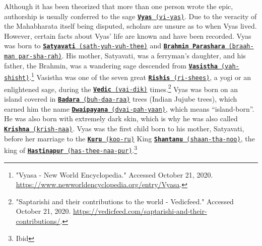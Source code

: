 \documentclass[10pt, letterpaper]{article}
\begin{document}
Although it has been theorized that more than one person wrote the epic,
authorship is usually conferred to the sage
\texttt{\underline{\textbf{\href{https://drive.google.com/file/d/12cpmbRkjohkLqUEyaP0_y7Y2CXE5YVam/view?usp=sharing}{Vyas}}
(vi-yas)}}. Due to the veracity of the Mahabharata itself being disputed,
scholars are unsure as to when Vyas lived. However, certain facts about
Vyas' life are known and have been recorded. Vyas was born to
\texttt{\underline{\href{https://drive.google.com/file/d/1N6ZbkjVOR-5Tl6Nwk2oZ76M9zSoGGIcI/view?usp=sharing}{\textbf{Satyavati}}
(sath-yuh-vuh-thee)}} and
\texttt{\underline{\href{https://drive.google.com/file/d/1M3Rknc2l6nV_ri-ZFsxkXIlV-g-udIMh/view?usp=sharing}{\textbf{Brahmin
Parashara}} (braah-man par-sha-rah)}}. His mother, Satyavati, was a
ferryman's daughter, and his father, the Brahmin, was a wandering sage
descended from
\texttt{\underline{\href{https://drive.google.com/file/d/1UBiNRUMQkQvRFdLQz8eNvUXrkh54ZBk0/view?usp=sharing}{\textbf{Vasistha}}
(vah-shisht)}}.\footnote{"Vyasa - New World Encyclopedia." Accessed
  October 21, 2020.
  \href{https://www.newworldencyclopedia.org/entry/Vyasa}{\underline{https://www.newworldencyclopedia.org/entry/Vyasa}}.}
Vasistha was one of the seven great
\texttt{\underline{\href{https://drive.google.com/file/d/1fETQfhYClXYbkn93U9efp-HwMDWboKcR/view?usp=sharing}{\textbf{Rishis}}
(ri-shees)}}, a yogi or an enlightened sage, during the
\texttt{\underline{\href{https://drive.google.com/file/d/18eL4_zTSc2jrYVD77qUzqoOmFkoZHqor/view?usp=sharing}{\textbf{Vedic}}
(vai-dik)}} times.\footnote{"Saptarishi and their contributions to the
  world - Vedicfeed." Accessed October 21, 2020.
  \href{https://vedicfeed.com/saptarishi-and-their-contributions/}{\underline{https://vedicfeed.com/saptarishi-and-their-contributions/}}.}
Vyas was born on an island covered in
\texttt{\underline{\href{https://drive.google.com/file/d/1VLNfXsKVPXZJmbgkvntV1IddTk5T7wZm/view?usp=sharing}{\textbf{Badara}}
(buh-daa-raa)}} trees (Indian Jujube trees), which earned him the name
\texttt{\underline{\href{https://drive.google.com/file/d/1F2arjRC_vmOMQkIiy4Kb1HUtYKybG49q/view?usp=sharing}{\textbf{Dwaipayana}}
(dvai-pah-yaan)}}, which means ``island-born''. He was also born with
extremely dark skin, which is why he was also called
\texttt{\underline{\href{https://drive.google.com/file/d/1e9kEn5cHUmHbHilre2HvLMAYKAPRULKg/view?usp=sharing}{\textbf{Krishna}}
(krish-naa)}}. Vyas was the first child born to his mother, Satyavati,
before her marriage to the
\texttt{\underline{\href{https://drive.google.com/file/d/1gFKrESPxHORwef_wMx6tkKcAnqWETUaQ/view?usp=sharing}{\textbf{Kuru}}
(koo-ru)}} King
\texttt{\underline{\href{https://drive.google.com/file/d/1k408zauSh2KHX84Dkm-jQeVLiv5DU9-6/view?usp=sharing}{\textbf{Shantanu}}
(shaan-tha-noo)}}, the king of
\texttt{\underline{\href{https://drive.google.com/file/d/17JxCzWzAyMEJIt51NBOgksl19dW2KkBN/view?usp=sharing}{\textbf{Hastinapur}}
(has-thee-naa-pur)}}.\footnote{Ibid} \\
\end{document}
